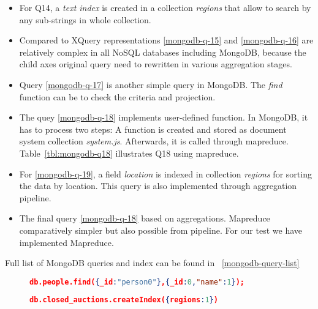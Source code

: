 \begin{itemize}
\item For Q14, a \textit{text index} is created in a collection \textit{regions} that allow to search by any sub-strings in whole collection. 

\item Compared to XQuery representations \ref{mongodb-q-15} and \ref{mongodb-q-16} are relatively complex in all NoSQL databases including MongoDB, because the child axes original query need to rewritten in various aggregation stages.

\item Query \ref{mongodb-q-17} is another simple query in MongoDB. The \textit{find} function can be to check the criteria and projection. 

\item The quey \ref{mongodb-q-18} implements user-defined function. In MongoDB, it has to process two steps: A function is created and stored as document system collection \textit{system.js}. Afterwards, it is called through mapreduce. Table~\ref{tbl:mongodb-q18} illustrates Q18 using mapreduce.

\item For \ref{mongodb-q-19}, a field  \textit{location} is indexed in collection \textit{regions} for sorting the data by location. This query is also implemented through aggregation pipeline. 
\item
The final query \ref{mongodb-q-18} based on aggregations. Mapreduce comparatively simpler but also possible from pipeline. For our test we have implemented Mapreduce. 
\end{itemize}
Full list of MongoDB queries and index can be found in ~\ref{mongodb-query-list}

\begin{figure}
\centering
\begin{lstlisting}[language=JSON, caption=XMark Query Q1 in MongoDB, label=mongo-xmark-q1]
		db.people.find({_id:"person0"},{_id:0,"name":1});
\end{lstlisting}

\centering
\begin{lstlisting}[language=JSON, caption=MongoDB secondary Index, label=mongodb-create-index]
             db.closed_auctions.createIndex({regions:1})
\end{lstlisting}
\end{figure}



